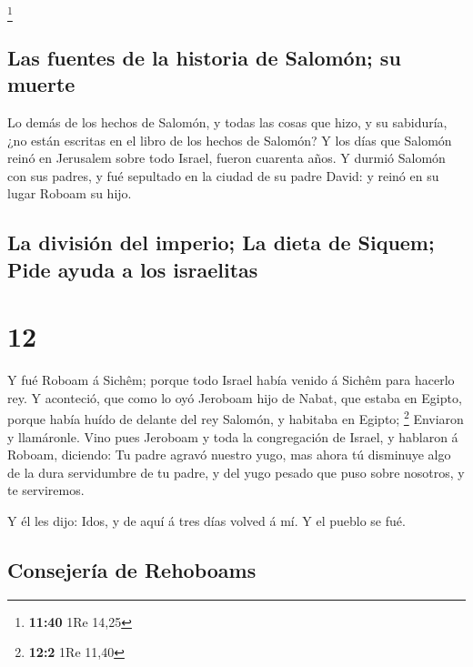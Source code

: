 \footnote{\textbf{11:40} 1Re 14,25}

\hypertarget{las-fuentes-de-la-historia-de-salomuxf3n-su-muerte}{%
\subsection{Las fuentes de la historia de Salomón; su
muerte}\label{las-fuentes-de-la-historia-de-salomuxf3n-su-muerte}}

 Lo demás de los hechos de Salomón, y todas las cosas que
hizo, y su sabiduría, ¿no están escritas en el libro de los hechos de
Salomón?  Y los días que Salomón reinó en Jerusalem sobre
todo Israel, fueron cuarenta años.  Y durmió Salomón con
sus padres, y fué sepultado en la ciudad de su padre David: y reinó en
su lugar Roboam su hijo.

\hypertarget{la-divisiuxf3n-del-imperio-la-dieta-de-siquem-pide-ayuda-a-los-israelitas}{%
\subsection{La división del imperio; La dieta de Siquem; Pide ayuda a
los
israelitas}\label{la-divisiuxf3n-del-imperio-la-dieta-de-siquem-pide-ayuda-a-los-israelitas}}

\hypertarget{section-11}{%
\section{12}\label{section-11}}

 Y fué Roboam á Sichêm; porque todo Israel había venido á
Sichêm para hacerlo rey.  Y aconteció, que como lo oyó
Jeroboam hijo de Nabat, que estaba en Egipto, porque había huído de
delante del rey Salomón, y habitaba en Egipto; \footnote{\textbf{12:2}
  1Re 11,40}  Enviaron y llamáronle. Vino pues Jeroboam y
toda la congregación de Israel, y hablaron á Roboam, diciendo:
 Tu padre agravó nuestro yugo, mas ahora tú disminuye algo
de la dura servidumbre de tu padre, y del yugo pesado que puso sobre
nosotros, y te serviremos.

 Y él les dijo: Idos, y de aquí á tres días volved á mí. Y
el pueblo se fué.

\hypertarget{consejeruxeda-de-rehoboams}{%
\subsection{Consejería de Rehoboams}\label{consejeruxeda-de-rehoboams}}

